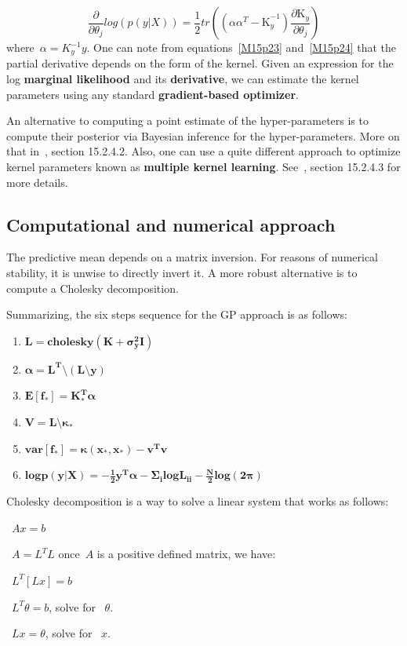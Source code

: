 \documentclass[]{IEEEtran}
\begin{document}
\begin{equation}
\frac { \partial  }{ { \partial \theta  }_{ j } } log(p(y|{ X }))=\frac { 1 }{ 2 } tr(({ { \alpha { \alpha  }^{ T }-\mathrm{K} } }_{ y }^{ -1 })\frac { \partial { \mathrm{K} }_{ y } }{ { \partial \theta  }_{ j } } )
\label{M15p24}
\end{equation}
where~\({ { \alpha =K } }_{ y }^{ -1 }y\). One can note from equations~\ref{M15p23} and~\ref{M15p24} that the partial derivative depends on the form of the kernel. Given an expression for the log \textbf{marginal likelihood} and its \textbf{derivative}, we can estimate the kernel parameters using any standard \textbf{gradient-based optimizer}.\par
An alternative to computing a point estimate of the hyper-parameters is to compute their posterior via Bayesian inference for the hyper-parameters. More on that in~\cite{Mur2012}, section 15.2.4.2. Also, one can use a quite different approach to optimize kernel parameters known as \textbf{multiple kernel learning}. See~\cite{Mur2012}, section 15.2.4.3 for more details.

\subsection{Computational and numerical approach}
The predictive mean depends on a matrix inversion. For reasons of numerical stability, it is unwise to directly invert it.  A more robust alternative is to compute a Cholesky decomposition. \par
Summarizing, the six steps sequence for the GP approach is as follows:
\begin{enumerate}
    \item \(\mathbf{L=cholesky(K+{ \sigma  }_{ y }^{ 2 }I)}\)
    \item \(\mathbf{\alpha ={ L }^{ T }\setminus (L\setminus y)}\)
    \item \(\mathbf{E[{ f }_{ * }]={ K }_{ * }^{ T }\alpha}\)
    \item \(\mathbf{V=L\setminus { \kappa  }_{ * }}\)
    \item \(\mathbf{var[{ f }_{ * }]=\kappa ({ x }_{ * },{ x }_{ * })-{ v }^{ T }v}\)
    \item \(\mathbf{logp(y|{ X }) = -\frac { 1 }{ 2 } { y }^{ T }\alpha  -{\Sigma  }_{ i }log{ L }_{ ii}-\frac { N }{ 2 } log(2\pi )}\)
\end{enumerate}

Cholesky decomposition is a way to solve a linear system that works as follows:\par
~\(A x = b\)\par
~\(A={ L }^{ T }L\) once~\(A\) is a positive defined matrix, we have:\par
~\({ L }^{ T }[Lx]=b\)\par
~\({ L }^{ T }\theta=b \), solve for ~\(\theta\).\par
~\(Lx=\theta\), solve for ~\(x\).\par
\end{document}
